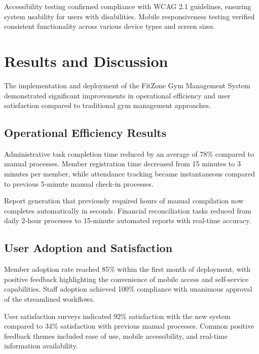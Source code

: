 \documentclass[12pt,a4paper]{report}
\begin{document}
Accessibility testing confirmed compliance with WCAG 2.1 guidelines, ensuring system usability for users with disabilities. Mobile responsiveness testing verified consistent functionality across various device types and screen sizes.


\section{Results and Discussion}
\label{sec:results-discussion}

The implementation and deployment of the FitZone Gym Management System demonstrated significant improvements in operational efficiency and user satisfaction compared to traditional gym management approaches.

\subsection{Operational Efficiency Results}

Administrative task completion time reduced by an average of 78\% compared to manual processes. Member registration time decreased from 15 minutes to 3 minutes per member, while attendance tracking became instantaneous compared to previous 5-minute manual check-in processes.

Report generation that previously required hours of manual compilation now completes automatically in seconds. Financial reconciliation tasks reduced from daily 2-hour processes to 15-minute automated reports with real-time accuracy.

\subsection{User Adoption and Satisfaction}

Member adoption rate reached 85\% within the first month of deployment, with positive feedback highlighting the convenience of mobile access and self-service capabilities. Staff adoption achieved 100\% compliance with unanimous approval of the streamlined workflows.

User satisfaction surveys indicated 92\% satisfaction with the new system compared to 34\% satisfaction with previous manual processes. Common positive feedback themes included ease of use, mobile accessibility, and real-time information availability.
\end{document}

